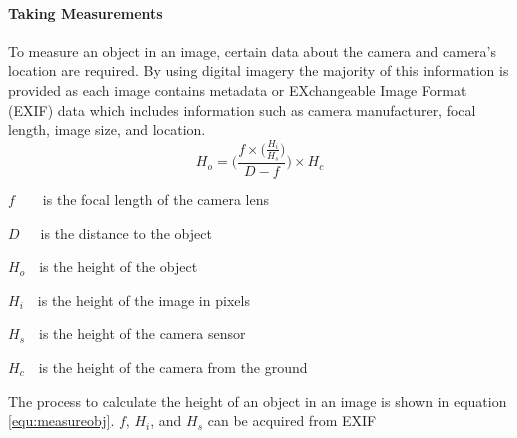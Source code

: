 	\paragraph{Taking Measurements}
	To measure an object in an image, certain data about the camera and camera's location are 
	required. By using digital imagery the majority of this information is provided as each image 
	contains metadata or EXchangeable Image Format (EXIF) data which includes information such as 
	camera manufacturer, focal length, image size, and location.
	\begin{equation}
		\label{equ:measureobj}
		H_{o} = \Bigg(\frac{f\times\big(\frac{H_{i}}{H_{s}}\big)}{D - f}\Bigg)\times H_{c}
	\end{equation}
	\begin{where}
		\item $f$~~~~is the focal length of the camera lens
		\item $D$~~~is the distance to the object
		\item $H_{o}$~~is the height of the object
		\item $H_{i}$~~is the height of the image in pixels
		\item $H_{s}$~~is the height of the camera sensor
		\item $H_{c}$~~is the height of the camera from the ground
	\end{where}

	\vspace{5mm}
	The process to calculate the height of an object in an image is shown in equation 
	\ref{equ:measureobj}. $f$, $H_{i}$, and $H_{s}$ can be acquired from EXIF 
